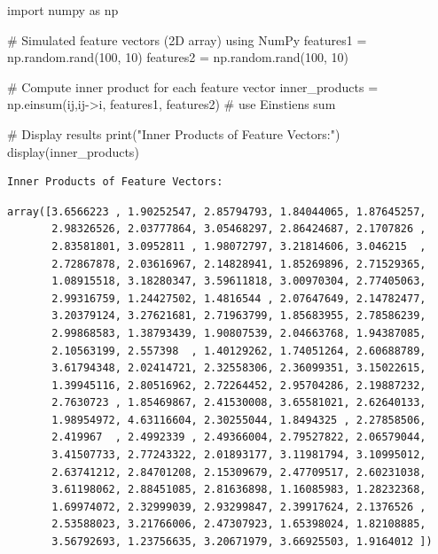 \documentclass[
  letterpaper,
  DIV=11,
  numbers=noendperiod]{scrreprt}
\newenvironment{Shaded}{\begin{snugshade}}{\end{snugshade}}
\newcommand{\BuiltInTok}[1]{\textcolor[rgb]{0.00,0.23,0.31}{#1}}
\newcommand{\CommentTok}[1]{\textcolor[rgb]{0.37,0.37,0.37}{#1}}
\newcommand{\DecValTok}[1]{\textcolor[rgb]{0.68,0.00,0.00}{#1}}
\newcommand{\ImportTok}[1]{\textcolor[rgb]{0.00,0.46,0.62}{#1}}
\newcommand{\NormalTok}[1]{\textcolor[rgb]{0.00,0.23,0.31}{#1}}
\newcommand{\OperatorTok}[1]{\textcolor[rgb]{0.37,0.37,0.37}{#1}}
\newcommand{\StringTok}[1]{\textcolor[rgb]{0.13,0.47,0.30}{#1}}
\theoremstyle{plain}
\theoremstyle{definition}
\theoremstyle{remark}
\begin{document}
\begin{Shaded}
\begin{Highlighting}[]
\ImportTok{import}\NormalTok{ numpy }\ImportTok{as}\NormalTok{ np}

\CommentTok{\# Simulated feature vectors (2D array) using NumPy}
\NormalTok{features1 }\OperatorTok{=}\NormalTok{ np.random.rand(}\DecValTok{100}\NormalTok{, }\DecValTok{10}\NormalTok{)}
\NormalTok{features2 }\OperatorTok{=}\NormalTok{ np.random.rand(}\DecValTok{100}\NormalTok{, }\DecValTok{10}\NormalTok{)}

\CommentTok{\# Compute inner product for each feature vector}
\NormalTok{inner\_products }\OperatorTok{=}\NormalTok{ np.einsum(}\StringTok{\textquotesingle{}ij,ij{-}\textgreater{}i\textquotesingle{}}\NormalTok{, features1, features2) }\CommentTok{\# use Einstien\textquotesingle{}s sum}

\CommentTok{\# Display results}
\BuiltInTok{print}\NormalTok{(}\StringTok{"Inner Products of Feature Vectors:"}\NormalTok{)}
\NormalTok{display(inner\_products)}
\end{Highlighting}
\end{Shaded}

\begin{verbatim}
Inner Products of Feature Vectors:
\end{verbatim}

\begin{verbatim}
array([3.6566223 , 1.90252547, 2.85794793, 1.84044065, 1.87645257,
       2.98326526, 2.03777864, 3.05468297, 2.86424687, 2.1707826 ,
       2.83581801, 3.0952811 , 1.98072797, 3.21814606, 3.046215  ,
       2.72867878, 2.03616967, 2.14828941, 1.85269896, 2.71529365,
       1.08915518, 3.18280347, 3.59611818, 3.00970304, 2.77405063,
       2.99316759, 1.24427502, 1.4816544 , 2.07647649, 2.14782477,
       3.20379124, 3.27621681, 2.71963799, 1.85683955, 2.78586239,
       2.99868583, 1.38793439, 1.90807539, 2.04663768, 1.94387085,
       2.10563199, 2.557398  , 1.40129262, 1.74051264, 2.60688789,
       3.61794348, 2.02414721, 2.32558306, 2.36099351, 3.15022615,
       1.39945116, 2.80516962, 2.72264452, 2.95704286, 2.19887232,
       2.7630723 , 1.85469867, 2.41530008, 3.65581021, 2.62640133,
       1.98954972, 4.63116604, 2.30255044, 1.8494325 , 2.27858506,
       2.419967  , 2.4992339 , 2.49366004, 2.79527822, 2.06579044,
       3.41507733, 2.77243322, 2.01893177, 3.11981794, 3.10995012,
       2.63741212, 2.84701208, 2.15309679, 2.47709517, 2.60231038,
       3.61198062, 2.88451085, 2.81636898, 1.16085983, 1.28232368,
       1.69974072, 2.32999039, 2.93299847, 2.39917624, 2.1376526 ,
       2.53588023, 3.21766006, 2.47307923, 1.65398024, 1.82108885,
       3.56792693, 1.23756635, 3.20671979, 3.66925503, 1.9164012 ])
\end{verbatim}
\end{document}
